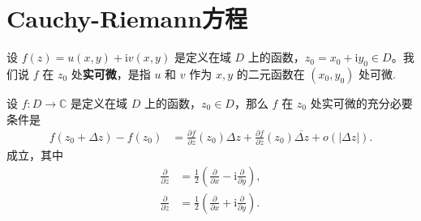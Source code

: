 \documentclass[../../main.tex]{subfiles}
\begin{document}
\section{Cauchy-Riemann方程}

\begin{definition}
设 \( f(z) = u(x,y) + \text{i}v(x,y) \) 是定义在域 \( D \) 上的函数，\( z_0 = x_0 + \text{i}y_0 \in D \)。我们说 \( f \) 在 \( z_0 \) 处\textbf{实可微}，是指 \( u \) 和 \( v \) 作为 \( x,y \) 的二元函数在 \( (x_0,y_0) \) 处可微.
\end{definition}

\begin{proposition}
设 \( f:D \to \mathbb{C} \) 是定义在域 \( D \) 上的函数，\( z_0 \in D \)，那么 \( f \) 在 \( z_0 \) 处实可微的充分必要条件是
\begin{align}\label{equation::::1-4}
f(z_0 + \Delta z) - f(z_0) &= \frac{\partial f}{\partial z}(z_0)\Delta z + \frac{\partial f}{\partial \overline{z}}(z_0)\overline{\Delta z} + o(|\Delta z|).
\end{align}
成立，其中
\begin{align*}
\frac{\partial}{\partial z} &= \frac{1}{2}\left( \frac{\partial}{\partial x} - \text{i}\frac{\partial}{\partial y} \right), \\
\frac{\partial}{\partial \overline{z}} &= \frac{1}{2}\left( \frac{\partial}{\partial x} + \text{i}\frac{\partial}{\partial y} \right).
\end{align*}
\end{proposition}
\end{document}
